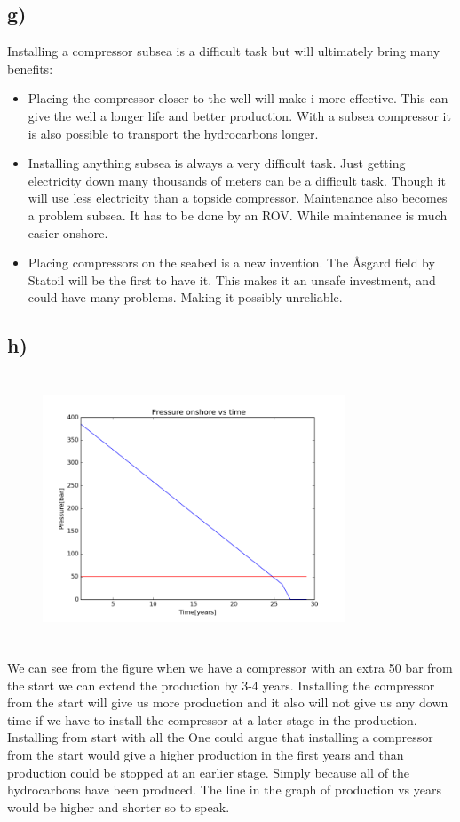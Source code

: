 \documentclass[DIV=calc, paper=a4, fontsize=13pt, twocolumn]{scrartcl}	 %
\begin{document}
\subsection*{g)}
Installing a compressor subsea is a difficult task but will ultimately bring many benefits:
\begin{itemize}
\item Placing the compressor closer to the well will make i more effective. This can give the well a longer life and better production. With a subsea compressor it is also possible to transport the hydrocarbons longer.
\item Installing anything subsea is always a very difficult task. Just getting electricity down many thousands of meters can be a difficult task. Though it will use less electricity than a topside compressor. Maintenance also becomes a problem subsea. It has to be done by an ROV. While maintenance is much easier onshore.
\item Placing compressors on the seabed is a new invention. The Åsgard field by Statoil will be the first to have it. This makes it an unsafe investment, and could have many problems. Making it possibly unreliable.
\end{itemize}


\subsection*{h)}
\begin{figure}[h]
\includegraphics[width=9cm,height=8cm]{Pressure_compressor.png}
\end{figure}
We can see from the figure when we have a compressor with an extra 50 bar from the start we can extend the production by 3-4 years. Installing the compressor from the start will give us more production and it also will not give us any down time if we have to install the compressor at a later stage in the production. Installing from start with all the
\newline
One could argue that installing a compressor from the start would give a higher production in the first years and than production could be stopped at an earlier stage. Simply because all of the hydrocarbons have been produced. The line in the graph of production vs years would be higher and shorter so to speak.
\end{document}
